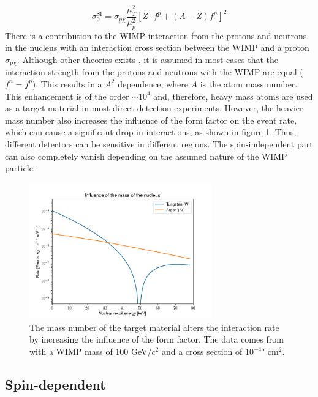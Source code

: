 \documentclass{article}
\begin{document}
\begin{equation}
    \sigma^\text{SI}_0 = \sigma_{p \chi} \frac{\mu_T^2}{\mu_p^2} \left[Z \cdot f^p + (A-Z) f^n \right]^2
\end{equation}
There is a contribution to the WIMP interaction from the protons and neutrons in the nucleus with an interaction cross section between the WIMP and a proton $\sigma_{p \chi}$. Although other theories exists \cite{Yaguna:2016bga}, it is assumed in most cases that the interaction strength from the protons and neutrons with the WIMP are equal ($f^n = f^p$). This results in a $A^2$ dependence, where $A$ is the atom mass number. This enhancement is of the order $\sim 10^4$ \cite{Vietze:2014vsa} and, therefore, heavy mass atoms are used as a target material in most direct detection experiments.
However, the heavier mass number also increases the influence of the form factor on the event rate, which can cause a significant drop in interactions, as shown in figure \ref{nucleus mass influence}. Thus, different detectors can be sensitive in different regions. The spin-independent part can also completely vanish depending on the assumed nature of the WIMP particle \cite{Lewin:1995rx}.


\begin{figure}[h]
    \centering
    \includegraphics[width=0.7\textwidth]{mass_influence.png}
    \caption{The mass number of the target material alters the interaction rate by increasing the influence of the form factor. The data comes from \cite{Undagoitia:2015gya} with a WIMP mass of 100 GeV/$c^2$ and a cross section of $10^{-45}$ cm$^2$.}
    \label{nucleus mass influence}
\end{figure}


\subsection{Spin-dependent}
\end{document}
